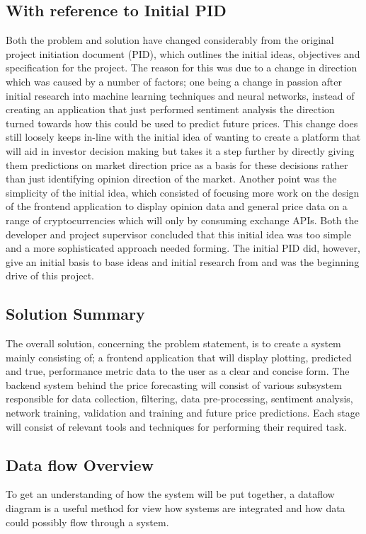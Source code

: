 \documentclass[oneside, 12pt]{article}
\begin{document}
		\subsection{With reference to Initial PID}
		Both the problem and solution have changed considerably from the original project initiation document (PID), which outlines the initial ideas, objectives and specification for the project. The reason for this was due to a change in direction which was caused by a number of factors; one being a change in passion after initial research into machine learning techniques and neural networks, instead of creating an application that just performed sentiment analysis the direction turned towards how this could be used to predict future prices. This change does still loosely keeps in-line with the initial idea of wanting to create a platform that will aid in investor decision making but takes it a step further by directly giving them predictions on market direction price as a basis for these decisions rather than just identifying opinion direction of the market. 
		Another point was the simplicity of the initial idea, which consisted of focusing more work on the design of the frontend application to display opinion data and general price data on a range of cryptocurrencies which will only by consuming exchange APIs. Both the developer and project supervisor concluded that this initial idea was too simple and a more sophisticated approach needed forming.
		The initial PID did, however, give an initial basis to base ideas and initial research from and was the beginning drive of this project.
		
		\subsection{Solution Summary}\label{summary}
		The overall solution, concerning the problem statement, is to create a system mainly consisting of; a frontend application that will display plotting, predicted and true, performance metric data to the user as a clear and concise form. The backend system behind the price forecasting will consist of various subsystem responsible for data collection, filtering, data pre-processing, sentiment analysis, network training, validation and training and future price predictions. Each stage will consist of relevant tools and techniques for performing their required task.
		
		\newpage
		
		\subsection{Data flow Overview}\label{data-flow}
		To get an understanding of how the system will be put together, a dataflow diagram is a useful method for view how systems are integrated and how data could possibly flow through a system.
		
\end{document}

